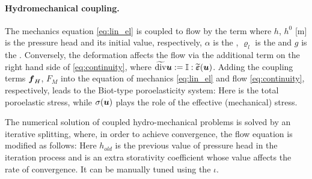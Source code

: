 \paragraph{Hydromechanical coupling.}
The mechanics equation \eqref{eq:lin_el} is coupled to flow by the term
where $h$, $h^0$ [$\mathrm{m}$] is the pressure head and its initial value, respectively, $\alpha$ \units{}{}{} is the , $\varrho_l$  is the  and $g$  is the .
Conversely, the deformation affects the flow via the additional term
on the right hand side of \eqref{eq:continuity}, where $\widetilde{\operatorname{div}}\mathbf{\boldsymbol{u}}:={\mathbb{I}}:\widetilde{\mathbf{\boldsymbol{\varepsilon}}}(\mathbf{\boldsymbol{u}})$.
Adding the coupling terms $\mathbf{\boldsymbol{f}}_H$, $F_M$ into the equation of mechanics \eqref{eq:lin_el} and flow \eqref{eq:continuity}, respectively, leads to the Biot-type poroelasticity system:
Here
is the total poroelastic stress, while $\sigma(\mathbf{\boldsymbol{u}})$ plays the role of the effective (mechanical) stress.

The numerical solution of coupled hydro-mechanical problems is solved by an iterative splitting, where, in order to achieve convergence, the flow equation is modified as follows:
Here $h_{old}$ is the previous value of pressure head in the iteration process and
 is an extra storativity coefficient whose value affects the rate of convergence.
It can be manually tuned using the  $\iota$.


